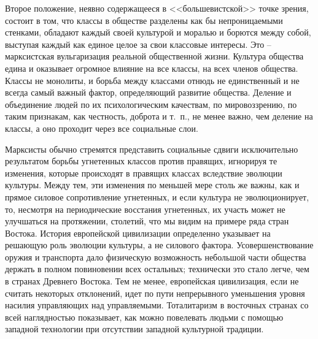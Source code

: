 \documentclass{book}
\begin{document}
Второе положение, неявно содержащееся в <<большевист­ской>> точке зрения, состоит в том, что классы в обществе разделены как бы непроницаемыми стенками, обладают каж­дый своей культурой и моралью и борются между собой, вы­ступая каждый как единое целое за свои классовые интересы. Это -- марксистская вульгаризация реальной общественной жизни. Культура общества едина и оказывает огромное вли­яние на все классы, на всех членов общества. Классы не моно­литы, и борьба между классами отнюдь не единственный и не всегда самый важный фактор, определяющий развитие обще­ства. Деление и объединение людей по их психологическим качествам, по мировоззрению, по таким признакам, как честность, доброта и т.~п., не менее важно, чем деление на классы, а оно проходит через все социальные слои.

Марксисты обычно стремятся представить социальные сдвиги исключительно результатом борьбы угнетенных классов против правящих, игнорируя те изменения, которые происходят в правящих классах вследствие эволюции культуры. Между тем, эти изменения по меньшей мере столь же важны, как и прямое силовое сопротивление угнетенных, и если культура не эволюционирует, то, несмотря на периодические восстания угнетенных, их участь может не улучшаться на протяжении, столетий, что мы видим на примере ряда стран Востока. История европейской цивилизации определенно указывает на решающую роль эволюции культуры, а не силового фактора. Усо­вершенствование оружия и транспорта дало физическую воз­можность небольшой части общества держать в полном по­виновении всех остальных; технически это стало легче, чем в странах Древнего Востока. Тем не менее, европейская циви­лизация, если не считать некоторых отклонений, идет по пути непрерывного уменьшения уровня насилия управляющих над управляемыми. Тоталитаризм в восточных странах со всей 
наглядностью показывает, как можно повелевать людьми с помощью западной технологии при отсутствии западной культурной традиции.
\end{document}

